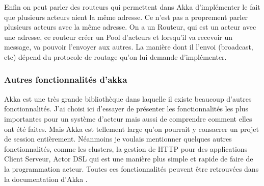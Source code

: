 \documentclass[12pt, a4paper]{article}
\begin{document}
\par Enfin on peut parler des routeurs qui permettent dans Akka d'implémenter le fait que plusieurs acteurs aient la même adresse. Ce n'est pas a proprement parler plusieurs acteurs avec la même adresse. On a un Routeur, qui est un acteur avec une adresse, ce routeur créer un Pool d'acteurs et lorsqu'il va recevoir un message, va pouvoir l'envoyer aux autres. La manière dont il l'envoi (broadcast, etc) dépend du protocole de routage qu'on lui demande d'implémenter.

\subsubsection{Autres fonctionnalités d'akka}
Akka est une très grande bibliothèque dans laquelle il existe beaucoup d'autres fonctionnalités. J'ai choisi ici d'essayer de présenter les fonctionnalités les plus importantes pour un système d'acteur mais aussi de comprendre comment elles ont été faites. Mais Akka est tellement large qu'on pourrait y consacrer un projet de session entièrement. Néanmoins je voulais mentionner quelques autres fonctionnalités, comme les clusters, la gestion de HTTP pour des applications Client Serveur, Actor DSL qui est une manière plus simple et rapide de faire de la programmation acteur. Toutes ces fonctionnalités peuvent être retrouvées dans la documentation d'Akka \cite{akka}.




\end{document}
